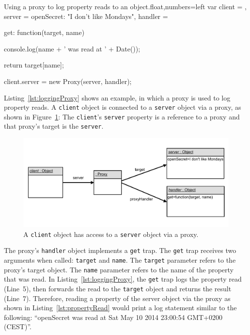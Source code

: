 \begin{code}{Using a proxy to log property reads to an object.}{float,numbers=left}
var client = {},
    server = {openSecret: "I don't like Mondays"},
    handler = {
        get: function(target, name) {
            console.log(name + ' was read at ' + Date());
            
            return target[name];
        }
    }

client.server = new Proxy(server, handler);
\end{code}
\iffalse
\end{verbatim}\fi

Listing~\ref{lst:loggingProxy} shows an example, in which a proxy is used to log property reads.
A \lstinline{client} object is connected to a \lstinline{server} object via a proxy, as shown in Figure~\ref{fig:LoggingProxy}:
The \lstinline{client}'s \lstinline{server} property is a reference to a proxy and that proxy's target is the \lstinline{server}.

\begin{figure}[h]
    \centering
    \includegraphics[width=\textwidth]{figures/5_implementation/1_loggingProxy.pdf}
    \caption{A \lstinline{client} object has access to a \lstinline{server} object via a proxy.}
    \label{fig:LoggingProxy}
\end{figure}

The proxy's \lstinline{handler} object implements a \lstinline{get} trap.
The \lstinline{get} trap receives two arguments when called: \lstinline{target} and \lstinline{name}.
The \lstinline{target} parameter refers to the proxy's target object.
The \lstinline{name} parameter refers to the name of the property that was read.
In Listing~\ref{lst:loggingProxy}, the \lstinline{get} trap logs the property read (Line~5), then forwards the read to the \lstinline{target} object and returns the result (Line~7).
Therefore, reading a property of the server object via the proxy as shown in Listing~\ref{lst:propertyRead} would print a log statement similar to the following: ``openSecret was read at Sat May 10 2014 23:00:54 GMT+0200 (CEST)''.


